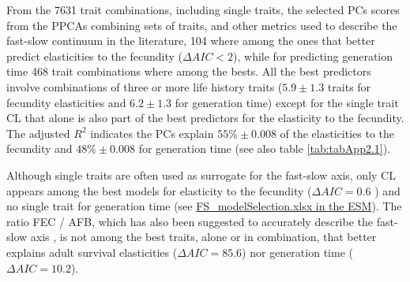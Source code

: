 From the 7631 trait combinations, including single traits, the selected PCs 
scores from the PPCAs combining sets of traits, and other metrics used to 
describe the fast-slow continuum in the literature, 104 where among the ones
that better predict elasticities to the fecundity ($\Delta AIC < 2$),
while for predicting generation time 468 trait combinations where among the
bests. All the best predictors involve combinations of three or more life
history traits ($5.9 \pm 1.3$ traits for fecundity elasticities and
$6.2 \pm 1.3$ for generation time) except for the single trait CL that alone is
also part of the best predictors for the elasticity to the fecundity.
The adjusted $R^2$ indicates the PCs explain $55\% \pm 0.008$ of the
elasticities to the fecundity and $48\% \pm 0.008$ for generation time
(see also table \ref{tab:tabApp2.1}).

Although single traits are often used as surrogate for the fast-slow axis, only
CL appears among the best models for elasticity to the fecundity ($\Delta
AIC = 0.6$ ) and no single trait for generation time (see
\href{https://github.com/jmaspons/Thesis/tree/master/ESM/chapter02}{
FS\_modelSelection.xlsx in the ESM}). The ratio FEC / AFB, which has also been
suggested to accurately describe the fast-slow axis \citep{Oli2004}⁠, is not
among the best traits, alone or in combination, that better explains adult
survival elasticities ($\Delta AIC = 85.6$) nor generation time ($\Delta AIC =
10.2$).


